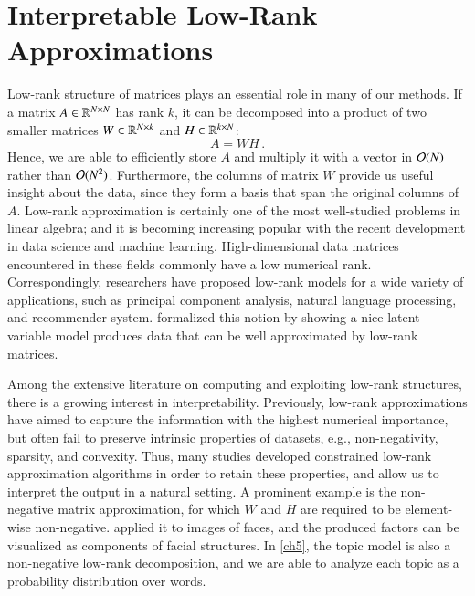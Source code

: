 \section{Interpretable Low\hyp{}Rank Approximations}\label{pre:lra}

Low\hyp{}rank structure of matrices plays an essential role in many of our
methods. If a matrix $A\in\mathbb{R}^{N\times N}$ has rank $k$, it can be
decomposed into a product of two smaller matrices $W\in\mathbb{R}^{N\times k}$ and
$H\in\mathbb{R}^{k\times N}$:
\begin{equation}\label{eqn:low_rank}
A = WH\,.
\end{equation}
Hence, we are able to efficiently store $A$ and multiply it with a vector in
$\mathcal{O}(N)$ rather than $\mathcal{O}(N^2)$. Furthermore, the columns of matrix $W$
provide us useful insight about the data, since they form a basis that span the
original columns of $A$. Low\hyp{}rank approximation is certainly one of the
most well\hyp{}studied problems in linear algebra; and it is becoming increasing
popular with the recent development in data science and machine learning. 
High\hyp{}dimensional data matrices encountered in these fields commonly have a
low numerical rank. Correspondingly, researchers have proposed low\hyp{}rank
models for a wide variety of applications, such as principal component analysis,
natural language processing, and recommender system. \citet{udell2019big}
formalized this notion by showing a nice latent variable model produces data
that can be well approximated by low\hyp{}rank matrices.

Among the extensive literature on computing and exploiting low\hyp{}rank
structures, there is a growing interest in interpretability. Previously, 
low\hyp{}rank approximations have aimed to capture the information with the
highest numerical importance, but often fail to preserve intrinsic properties of
datasets, e.g., non\hyp{}negativity, sparsity, and convexity. Thus, many studies
developed constrained low\hyp{}rank approximation algorithms in order to retain
these properties, and allow us to interpret the output in a natural setting. A
prominent example is the non\hyp{}negative matrix approximation, for which $W$
and $H$ are required to be element\hyp{}wise non\hyp{}negative. 
\citet{lee1999learning} applied it to images of faces, and the produced factors
can be visualized as components of facial structures. In \cref{ch5}, the topic
model is also a non\hyp{}negative low\hyp{}rank decomposition, and we are able
to analyze each topic as a probability distribution over words.

